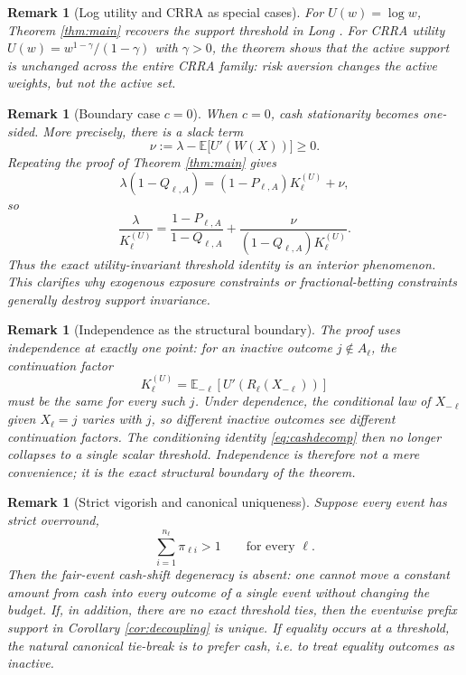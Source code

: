 \documentclass[11pt]{article}
\newtheorem{remark}[theorem]{Remark}
\newcommand{\E}{\mathbb{E}}
\begin{document}
\begin{remark}[Log utility and CRRA as special cases]\label{rem:crra}
For $U(w)=\log w$, Theorem \ref{thm:main} recovers the support threshold in Long \cite{Long2026}. For CRRA utility $U(w)=w^{1-\gamma}/(1-\gamma)$ with $\gamma>0$, the theorem shows that the active support is unchanged across the entire CRRA family: risk aversion changes the active weights, but not the active set.
\end{remark}

\begin{remark}[Boundary case $c=0$]\label{rem:boundary}
When $c=0$, cash stationarity becomes one-sided. More precisely, there is a slack term
\[
  \nu:=\lambda-\E\bigl[U'(W(X))\bigr]\ge 0.
\]
Repeating the proof of Theorem \ref{thm:main} gives
\[
  \lambda(1-Q_{\ell,A})=(1-P_{\ell,A})K_\ell^{(U)}+\nu,
\]
so
\[
  \frac{\lambda}{K_\ell^{(U)}}
  =
  \frac{1-P_{\ell,A}}{1-Q_{\ell,A}} + \frac{\nu}{(1-Q_{\ell,A})K_\ell^{(U)}}.
\]
Thus the exact utility-invariant threshold identity is an interior phenomenon. This clarifies why exogenous exposure constraints or fractional-betting constraints generally destroy support invariance.
\end{remark}

\begin{remark}[Independence as the structural boundary]\label{rem:independence}
The proof uses independence at exactly one point: for an inactive outcome $j\notin A_\ell$, the continuation factor
\[
  K_\ell^{(U)}=\E_{-\ell}[U'(R_\ell(X_{-\ell}))]
\]
must be the same for every such $j$. Under dependence, the conditional law of $X_{-\ell}$ given $X_\ell=j$ varies with $j$, so different inactive outcomes see different continuation factors. The conditioning identity \eqref{eq:cashdecomp} then no longer collapses to a single scalar threshold. Independence is therefore not a mere convenience; it is the exact structural boundary of the theorem.
\end{remark}

\begin{remark}[Strict vigorish and canonical uniqueness]\label{rem:vigorish}
Suppose every event has strict overround,
\[
  \sum_{i=1}^{n_\ell}\pi_{\ell i}>1 \qquad \text{for every }\ell.
\]
Then the fair-event cash-shift degeneracy is absent: one cannot move a constant amount from cash into every outcome of a single event without changing the budget. If, in addition, there are no exact threshold ties, then the eventwise prefix support in Corollary \ref{cor:decoupling} is unique. If equality occurs at a threshold, the natural canonical tie-break is to prefer cash, i.e. to treat equality outcomes as inactive.
\end{remark}
\end{document}
